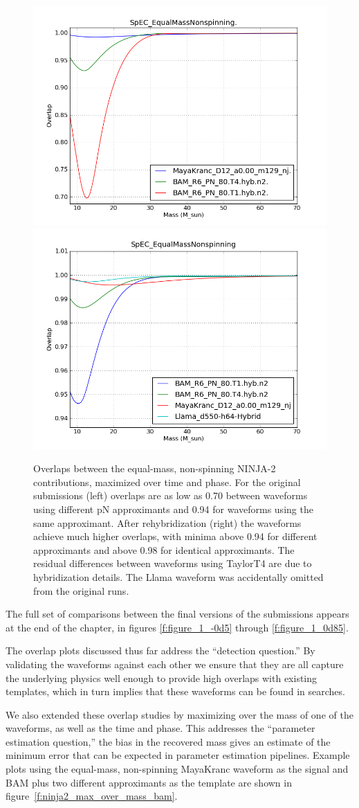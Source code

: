 \begin{figure}
  \includegraphics[width=0.5\linewidth]{figures/ninja2/q_1_z_0_figure03}
  \includegraphics[width=0.5\linewidth]{figures/ninja2/figure2_1_0_16}
  \caption[Overlaps between NINJA-2 submissions maximized over time
and phase]{
  \label{f:ninja2_overlap_test}
Overlaps between the equal-mass, non-spinning NINJA-2 contributions,
maximized over time and phase.   For the original submissions (left)
overlaps are as low as 0.70 between waveforms using different pN
approximants and 0.94 for waveforms using the same approximant.  After
rehybridization (right) the waveforms achieve much higher overlaps,
with minima above 0.94 for different approximants and above 0.98 for
identical approximants.  The residual differences between waveforms
using TaylorT4 are due to hybridization details.  The Llama waveform
was accidentally omitted from the original runs.}
\end{figure}%

The full set of comparisons between the final versions of the
submissions appears at the end of the chapter, in figures
\ref{f:figure_1_-0d5} through \ref{f:figure_1_0d85}.

The overlap plots discussed thus far address the ``detection
question.''  By validating the waveforms against each other we ensure
that they are all capture the underlying physics well enough to
provide high overlaps with existing templates, which in turn implies
that these waveforms can be found in searches.  

We also extended these overlap studies by maximizing over the mass of
one of the waveforms, as well as the time and phase.  This addresses
the ``parameter estimation question,'' the bias in the recovered mass
gives an estimate of the minimum error that can be expected in
parameter estimation pipelines.  Example plots using the equal-mass,
non-spinning MayaKranc waveform as the signal and BAM plus two
different approximants as the template are shown in
figure~\ref{f:ninja2_max_over_mass_bam}.


